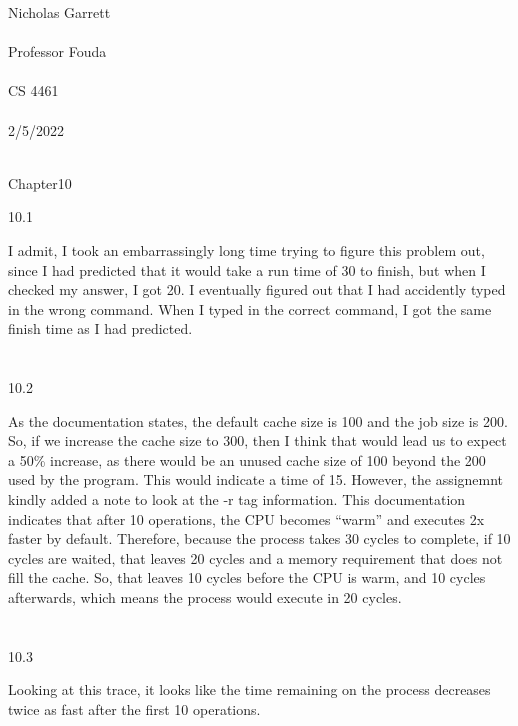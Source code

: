 \documentclass[12pt, a4paper]{article}
\begin{document}
\noindent
Nicholas Garrett\\ \\
Professor Fouda\\ \\
CS 4461\\ \\
2/5/2022\\ \\


\begin{center}
\end{center}

\noindent
Chapter10

10.1

	I admit, I took an embarrassingly long time trying to figure this problem out, since I had predicted that it would take a run time of 30 to finish, but when I checked my answer, I got 20. I eventually figured out that I had accidently typed in the wrong command. When I typed in the correct command, I got the same finish time as I had predicted.\\ \\ \\
	
10.2
	
	As the documentation states, the default cache size is 100 and the job size is 200. So, if we increase the cache size to 300, then I think that would lead us to expect a 50\% increase, as there would be an unused cache size of 100 beyond the 200 used by the program. 
	This would indicate a time of 15.  However, the assignemnt kindly added a note to look at the -r tag information. This documentation indicates that after 10 operations, the CPU becomes ``warm'' and executes 2x faster by default. Therefore, because the process takes 30 cycles to complete, if 10 cycles are waited, that leaves 20 cycles and a memory requirement that does not fill the cache.
	So, that leaves 10 cycles before the CPU is warm, and 10 cycles afterwards, which means the process would execute in 20 cycles.\\ \\ \\

10.3
	
	Looking at this trace, it looks like the time remaining on the process decreases twice as fast after the first 10 operations. \\ \\ \\
\end{document}
